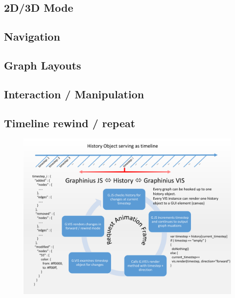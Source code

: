 	\subsection{2D/3D Mode}
	\label{ssect:vis_2d3d}
	
	\subsection{Navigation}
	\label{ssect:vis_navigation}
	
	\subsection{Graph Layouts}
	\label{ssect:vis_layouts}	
	
	\subsection{Interaction / Manipulation}
	\label{ssect:vis_interact_manipulate}
	
	\subsection{Timeline rewind / repeat}
	\label{ssect:vis_timeline}


\begin{landscape}
\begin{figure}[ht]
	\label{fig_history_workflow}
	\centering
	\vspace{-2.0cm}
	\includegraphics[width=1.7\textwidth]{figures/History_Workflow_pdf}
\end{figure}
\end{landscape}



